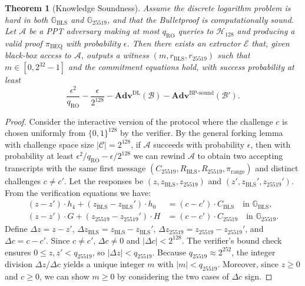 \documentclass[11pt]{article}
\theoremstyle{definitionstyle}
\newtheorem{theorem}{Theorem}[section]
\theoremstyle{plain}
\newcommand{\advantage}[1]{\mathbf{Adv}^{\mathrm{#1}}}
\begin{document}
\begin{theorem}[Knowledge Soundness]
Assume the discrete logarithm problem is hard in both $\mathbb{G}_{\text{BLS}}$ and $\mathbb{G}_{25519}$, and that the Bulletproof is computationally sound. Let $\mathcal{A}$ be a PPT adversary making at most $q_{\text{RO}}$ queries to $\mathcal{H}_{128}$ and producing a valid proof $\pi_{\text{BEQ}}$ with probability $\epsilon$. Then there exists an extractor $\mathcal{E}$ that, given black-box access to $\mathcal{A}$, outputs a witness $(m, r_{\text{BLS}}, r_{25519})$ such that $m \in [0,2^{32}-1]$ and the commitment equations hold, with success probability at least
\[
\frac{\epsilon^2}{q_{\text{RO}}} - \frac{\epsilon}{2^{128}} - \advantage{DL}(\mathcal{B}) - \advantage{BP\text{-}sound}(\mathcal{B}').
\]
\end{theorem}
\begin{proof}
Consider the interactive version of the protocol where the challenge $c$ is chosen uniformly from $\{0,1\}^{128}$ by the verifier. By the general forking lemma~\cite{PointchevalStern00} with challenge space size $|\mathcal{C}| = 2^{128}$, if $\mathcal{A}$ succeeds with probability $\epsilon$, then with probability at least $\epsilon^2/q_{\text{RO}} - \epsilon/2^{128}$ we can rewind $\mathcal{A}$ to obtain two accepting transcripts with the same first message $(C_{25519}, R_{\text{BLS}}, R_{25519}, \pi_{\text{range}})$ and distinct challenges $c \neq c'$. Let the responses be $(z, z_{\text{BLS}}, z_{25519})$ and $(z', z_{\text{BLS}}', z_{25519}')$. From the verification equations we have:
\begin{align*}
(z - z') \cdot h_4 + (z_{\text{BLS}} - z_{\text{BLS}}') \cdot h_0 &= (c - c') \cdot C_{\text{BLS}} \quad \text{in } \mathbb{G}_{\text{BLS}}, \\
(z - z') \cdot G + (z_{25519} - z_{25519}') \cdot H &= (c - c') \cdot C_{25519} \quad \text{in } \mathbb{G}_{25519}.
\end{align*}
Define $\Delta z = z - z'$, $\Delta z_{\text{BLS}} = z_{\text{BLS}} - z_{\text{BLS}}'$, $\Delta z_{25519} = z_{25519} - z_{25519}'$, and $\Delta c = c - c'$. Since $c \neq c'$, $\Delta c \neq 0$ and $|\Delta c| < 2^{128}$. The verifier's bound check ensures $0 \le z, z' < q_{25519}$, so $|\Delta z| < q_{25519}$. Because $q_{25519} \approx 2^{252}$, the integer division $\Delta z / \Delta c$ yields a unique integer $m$ with $|m| < q_{25519}$. Moreover, since $z \ge 0$ and $c \ge 0$, we can show $m \ge 0$ by considering the two cases of $\Delta c$ sign.


\end{proof}
\end{document}
